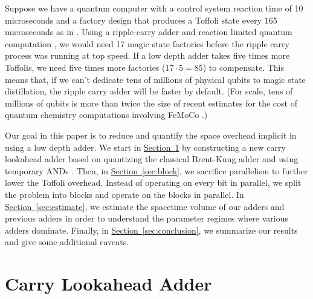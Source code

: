 \documentclass[onecolumn,unpublished]{quantumarticle}
\theoremstyle{definition}
\theoremstyle{definition}
\theoremstyle{definition}
\renewcommand{\sec}[1]{\hyperref[sec:#1]{Section~\ref*{sec:#1}}}
\begin{document}
Suppose we have a quantum computer with a control system reaction time of 10 microseconds and a factory design that produces a Toffoli state every 165 microseconds as in \cite{gidney2019autoccz}.
Using a ripple-carry adder and reaction limited quantum computation \cite{fowler2012timeoptimal,gidney2019autoccz}, we would need 17 magic state factories before the ripple carry process was running at top speed.
If a low depth adder takes five times more Toffolis, we need five times more factories ($17 \cdot 5 = 85$) to compensate.
This means that, if we can't dedicate tens of millions of physical qubits to magic state distillation, the ripple carry adder will be faster by default.
(For scale, tens of millions of qubits is more than twice the size of recent estimates for the cost of quantum chemistry computations involving FeMoCo \cite{lee2020hypercontractionchemistry}.)

\begin{table}
\centering
\resizebox{\linewidth}{!}{

}
    \caption{Comparison of various adders.
    The Toffoli over time column shows how many Toffolis a circuit executes during each time step (blank areas are due to AND uncomputations), using a logarithmic scale.
    The value $V(n,f)$ is an estimate (in units of logical qubits times seconds) of the spacetime volume required to execute an $n$-bit adder using at most $f$ magic state factories (see \sec{estimate} for more details).
    This table is generated by the ancillary file \texttt{assets/comparison\_table.py}.
    }
    \label{tbl:comparison}
\end{table}

Our goal in this paper is to reduce and quantify the space overhead implicit in using a low depth adder.
We start in \sec{lookahead} by constructing a new carry lookahead adder based on quantizing the classical Brent-Kung adder \cite{brent1982adder} and using temporary ANDs \cite{gidney2018halving}.
Then, in \sec{block}, we sacrifice parallelism to further lower the Toffoli overhead.
Instead of operating on every bit in parallel, we split the problem into blocks and operate on the blocks in parallel.
In \sec{estimate}, we estimate the spacetime volume of our adders and previous adders in order to understand the parameter regimes where various adders dominate.
Finally, in \sec{conclusion}, we summarize our results and give some additional caveats.


\section{Carry Lookahead Adder}
\label{sec:lookahead}
\end{document}
